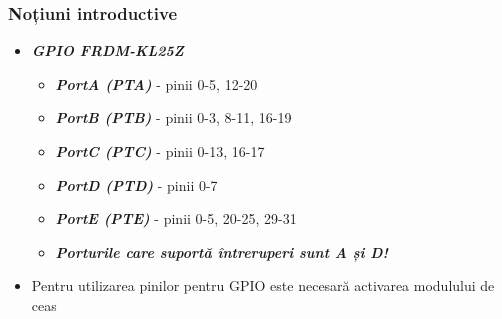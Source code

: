 \documentclass[xcolor={table}]{beamer}
\begin{document}
		\begin{frame}
	    \frametitle{Noțiuni introductive}
	    \begin{itemize}
	        \item \textbf{\textit{GPIO FRDM-KL25Z}}
	        \begin{itemize}
	            \item \textbf{\textit{PortA (PTA)}}  - pinii 0-5, 12-20
	            \item \textbf{\textit{PortB (PTB)}}  - pinii 0-3, 8-11, 16-19
	            \item \textbf{\textit{PortC (PTC)}}  - pinii 0-13, 16-17
	            \item \textbf{\textit{PortD (PTD)}}  - pinii 0-7
	            \item \textbf{\textit{PortE (PTE)}}  - pinii 0-5, 20-25, 29-31
	            \item \textbf{\textit{Porturile care suportă întreruperi sunt A și D!}}
	        \end{itemize}
	        \item Pentru utilizarea pinilor pentru GPIO este necesară activarea modulului de ceas
	        
	    \end{itemize}
	\end{frame}
\end{document}
